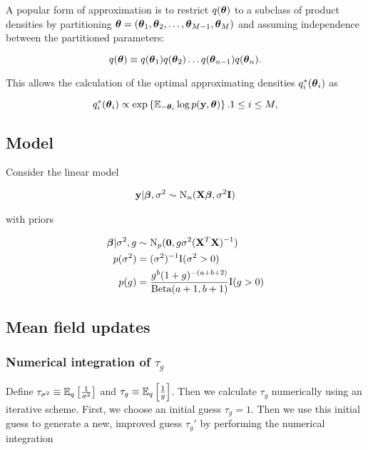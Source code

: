\documentclass{amsart}[12pt]
\begin{document}
A popular form of approximation is to restrict $q({\boldsymbol \theta})$ to a subclass of product densities by partitioning
${\boldsymbol \theta} = ({\boldsymbol \theta}_1, {\boldsymbol \theta}_2, \ldots, {\boldsymbol \theta}_{M-1}, {\boldsymbol \theta}_M)$ and assuming independence between the
partitioned parameters:

\begin{equation*}
q({\boldsymbol \theta}) \equiv q({\boldsymbol \theta}_1) q({\boldsymbol \theta}_2) \ldots q({\boldsymbol \theta}_{n-1}) q({\boldsymbol \theta}_n).
\end{equation*}

This allows the calculation of the optimal approximating densities $q_i^*({\boldsymbol \theta}_i)$ as

\begin{equation*}
q_i^*({\boldsymbol \theta}_i) \propto \exp \left \{ \mathbb{E}_{-{\boldsymbol \theta}_i} \log p({\bf y}, {\boldsymbol \theta}) \right \}. 1 \leq i \leq M,
\end{equation*}

\subsection{Model}

Consider the linear model

\begin{align*}
{\bf y} | {\boldsymbol \beta}, \sigma^2 \sim \text{N}_n({\bf X} {\boldsymbol \beta}, \sigma^2 {\bf I})
\end{align*}

with priors

\begin{align*}
{\boldsymbol\beta} | \sigma^2, g &\sim \text{N}_p({\bf 0}, g \sigma^2 ({\bf X}^T {\bf X})^{-1}) \\
p(\sigma^2) &= (\sigma^2)^{-1} \text{I}(\sigma^2 > 0) \\
p(g) &= \frac{g^b (1 + g)^{-(a + b + 2)}}{\text{Beta}(a + 1, b + 1)} \text{I}(g > 0)
\end{align*}

\subsection{Mean field updates}

\subsubsection{Numerical integration of $\tau_g$}\label{sec:num_int}

Define $\tau_{\sigma^2} \equiv \mathbb{E}_q \left[ \frac{1}{\sigma^2} \right]$ and
$\tau_g \equiv \mathbb{E}_q \left[ \frac{1}{g} \right]$. Then we calculate $\tau_g$ numerically using an iterative 
scheme. First, we choose an initial guess $\tau_g = 1$. Then we use this initial guess to generate a new,
improved guess $\tau_g'$ by performing the numerical integration
\end{document}
